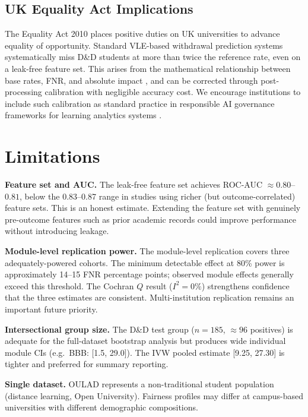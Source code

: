 \documentclass[12pt,a4paper]{article}
\begin{document}
\subsection{UK Equality Act Implications}

The Equality Act 2010 \citep{equalityact2010} places positive duties on UK
universities to advance equality of opportunity. Standard VLE-based withdrawal
prediction systems systematically miss D\&D students at more than twice the
reference rate, even on a leak-free feature set. This arises from the
mathematical relationship between base rates, FNR, and absolute impact
\citep{chouldechova2017}, and can be corrected through post-processing
calibration with negligible accuracy cost. We encourage institutions to
include such calibration as standard practice in responsible AI governance
frameworks for learning analytics systems \citep{slade2013, prinsloo2013}.

\section{Limitations}

\textbf{Feature set and AUC.} The leak-free feature set achieves
ROC-AUC $\approx 0.80$--$0.81$, below the 0.83--0.87 range in studies using
richer (but outcome-correlated) feature sets. This is an honest estimate.
Extending the feature set with genuinely pre-outcome features such as prior
academic records could improve performance without introducing leakage.

\textbf{Module-level replication power.} The module-level replication covers
three adequately-powered cohorts. The minimum detectable effect at 80\% power
is approximately 14--15 FNR percentage points; observed module effects
generally exceed this threshold. The Cochran $Q$ result ($I^2 = 0\%$)
strengthens confidence that the three estimates are consistent.
Multi-institution replication remains an important future priority.

\textbf{Intersectional group size.} The D\&D test group ($n = 185$,
$\approx 96$ positives) is adequate for the full-dataset bootstrap analysis
but produces wide individual module CIs (e.g.\ BBB: [1.5, 29.0]). The IVW
pooled estimate [9.25, 27.30] is tighter and preferred for summary reporting.

\textbf{Single dataset.} OULAD represents a non-traditional student
population (distance learning, Open University). Fairness profiles may differ
at campus-based universities with different demographic compositions.
\end{document}
